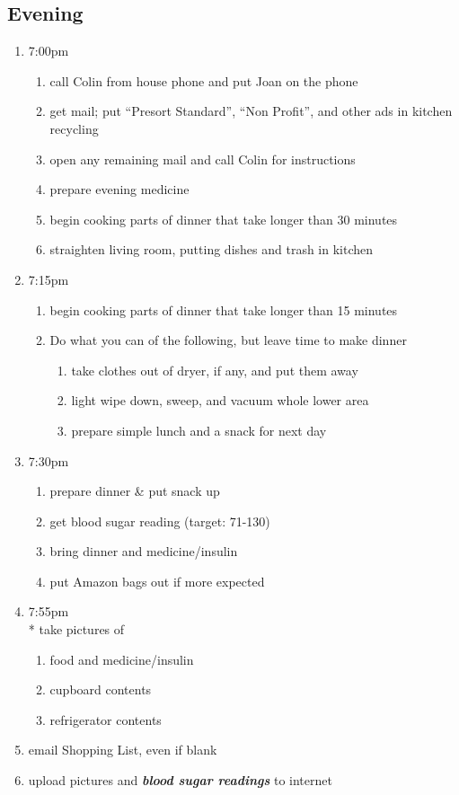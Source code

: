 \documentclass[12pt,letterpaper]{article}
\begin{document}
\begin{multicols}{2}
\subsection*{Evening}
\begin{enumerate}
	\item 7:00pm
		\begin{enumerate}
			\item call Colin from house phone and put Joan on the phone
			\item get mail; put ``Presort Standard'', ``Non Profit'', and other ads in kitchen recycling
			\item open any remaining mail and call Colin for instructions
			\item prepare evening medicine
			\item begin cooking parts of dinner that take longer than 30 minutes
			\item straighten living room, putting dishes and trash in kitchen
		\end{enumerate}
	\item 7:15pm 
		\begin{enumerate}
			\item begin cooking parts of dinner that take longer than 15 minutes
			\item	Do what you can of the following, but leave time to make dinner
				\begin{enumerate}
					\item take clothes out of dryer, if any, and put them away
					\item light wipe down, sweep, and vacuum whole lower area
					\item prepare simple lunch and a snack for next day
				\end{enumerate}
		\end{enumerate}
	\item 7:30pm
		\begin{enumerate}
			\item prepare dinner \& put snack up
			\item get blood sugar reading (target: 71-130)
			\item bring dinner and medicine/insulin
			\item put Amazon bags out if more expected
		\end{enumerate}
	\item 7:55pm \\*
		take pictures of 
		\begin{enumerate}
			\item food and medicine/insulin
			\item	cupboard contents
			\item	refrigerator contents
		\end{enumerate}
	\item email Shopping List, even if blank
	\item upload pictures and \textit{\textbf{blood sugar readings}} to internet
\end{enumerate}
\end{multicols}
\end{document}
